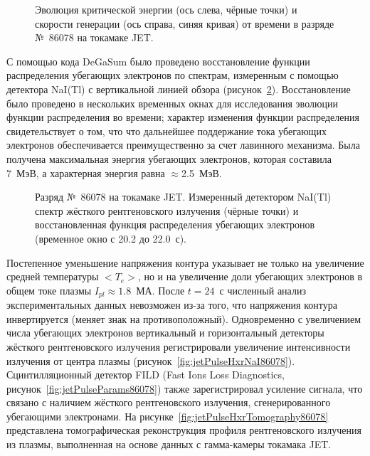 \begin{figure}[ht!]
  \caption{ Эволюция критической энергии (ось слева, чёрные точки) и скорости генерации (ось справа, синяя кривая) от времени в разряде №~86078 на токамаке JET.~\cite{Plyusnin2015} }
  \label{fig:jetPulseCriticalEnergy86078}
\end{figure}

С помощью кода DeGaSum было проведено восстановление функции распределения убегающих электронов по спектрам, измеренным с помощью детектора NaI(Tl) с вертикальной линией обзора (рисунок~\ref{fig:jetPulseEdf86078}). Восстановление было проведено в нескольких временных окнах для исследования эволюции функции распределения во времени; характер изменения функции распределения свидетельствует о том, что что дальнейшее поддержание тока убегающих электронов обеспечивается преимущественно за счет лавинного механизма. Была получена максимальная энергия убегающих электронов, которая составила 7~МэВ, а характерная энергия равна $\approx$2.5~МэВ.~\cite{Plyusnin2015}

\begin{figure}[ht!]
  \caption{ Разряд №~86078 на токамаке JET. Измеренный детектором NaI(Tl) спектр жёсткого рентгеновского излучения (чёрные точки) и восстановленная функция распределения убегающих электронов (временное окно с 20.2 до 22.0~с).~\cite{Plyusnin2015} }
  \label{fig:jetPulseEdf86078}
\end{figure}

Постепенное уменьшение напряжения контура указывает не только на увеличение средней температуры $<T_e>$, но и на увеличение доли убегающих электронов в общем токе плазмы $I_{pl} \approx 1.8$~МА. После $t = 24$~с численный анализ экспериментальных данных невозможен из-за того, что напряжения контура инвертируется (меняет знак на противоположный). Одновременно с увеличением числа убегающих электронов вертикальный и горизонтальный детекторы жёсткого рентгеновского излучения регистрировали увеличение интенсивности излучения от центра плазмы (рисунок~\ref{fig:jetPulseHxrNaI86078}). Сцинтилляционный детектор FILD (Fast Ions Loss Diagnostics, рисунок~\ref{fig:jetPulseParams86078}) также зарегистрировал усиление сигнала, что связано с наличием жёсткого рентгеновского излучения, сгенерированного убегающими электронами. На рисунке~\ref{fig:jetPulseHxrTomography86078} представлена томографическая реконструкция профиля рентгеновского излучения из плазмы, выполненная на основе данных с гамма-камеры токамака JET.~\cite{Plyusnin2015}


